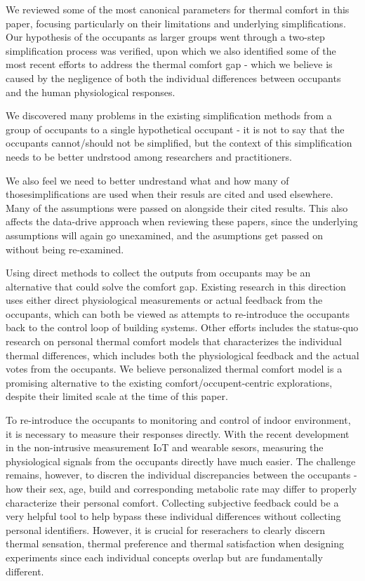 We reviewed some of the most canonical parameters for thermal comfort in this paper, focusing particularly on their limitations and underlying simplifications. Our hypothesis of the occupants as larger groups went through a two-step simplification process was verified, upon which we also identified some of the most recent efforts to address the thermal comfort gap - which we believe is caused by the negligence of both the individual differences between occupants and the human physiological responses.

We discovered many problems in the existing simplification methods from a group of occupants to a single hypothetical occupant - it is not to say that the occupants cannot/should not be simplified, but the context of this simplification needs to be better undrstood among researchers and practitioners.

We also feel we need to better undrestand what and how many of thosesimplifications are used when their resuls are cited and used elsewhere. Many of the assumptions were passed on alongside their cited results. This also affects the data-drive approach when reviewing these papers, since the underlying assumptions will again go unexamined, and the asumptions get passed on without being re-examined.

Using direct methods to collect the outputs from occupants may be an alternative that could solve the comfort gap. Existing research in this direction uses either direct physiological measurements or actual feedback from the occupants, which can both be viewed as attempts to re-introduce the occupants back to the control loop of building systems. Other efforts includes the status-quo research on personal thermal comfort models that characterizes the individual thermal differences, which includes both the physiological feedback and the actual votes from the occupants. We believe personalized thermal comfort model is a promising alternative to the existing comfort/occupent-centric explorations, despite their limited scale at the time of this paper. 


To re-introduce the occupants to monitoring and control of indoor environment, it is necessary to measure their responses directly. With the recent development in the non-intrusive measurement IoT and wearable sesors, measuring the physiological signals from the occupants directly have much easier. The challenge remains, however, to discren the individual discrepancies between the occupants - how their sex, age, build and corresponding metabolic rate may differ to properly characterize their personal comfort. Collecting subjective feedback could be a very helpful tool to help bypass these individual differences without collecting personal identifiers. However, it is crucial for reserachers to clearly discern thermal sensation, thermal preference and thermal satisfaction when designing experiments since each individual concepts overlap but are fundamentally different. 


